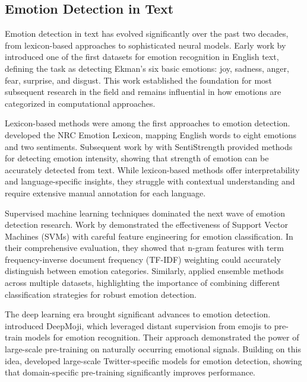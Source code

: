 \documentclass[a4paper,12pt]{extarticle}
\begin{document}
\subsection{Emotion Detection in Text}

Emotion detection in text has evolved significantly over the past two decades, from lexicon-based approaches to sophisticated neural models. Early work by \cite{strapparava2007semeval} introduced one of the first datasets for emotion recognition in English text, defining the task as detecting Ekman's six basic emotions: joy, sadness, anger, fear, surprise, and disgust. This work established the foundation for most subsequent research in the field and remains influential in how emotions are categorized in computational approaches.

Lexicon-based methods were among the first approaches to emotion detection. \cite{mohammad2013crowdsourcing} developed the NRC Emotion Lexicon, mapping English words to eight emotions and two sentiments. Subsequent work by \cite{thelwall2010sentiment} with SentiStrength provided methods for detecting emotion intensity, showing that strength of emotion can be accurately detected from text. While lexicon-based methods offer interpretability and language-specific insights, they struggle with contextual understanding and require extensive manual annotation for each language.

Supervised machine learning techniques dominated the next wave of emotion detection research. Work by \cite{balahur2013sentiment} demonstrated the effectiveness of Support Vector Machines (SVMs) with careful feature engineering for emotion classification. In their comprehensive evaluation, they showed that n-gram features with term frequency-inverse document frequency (TF-IDF) weighting could accurately distinguish between emotion categories. Similarly, \cite{colneric2018emotion} applied ensemble methods across multiple datasets, highlighting the importance of combining different classification strategies for robust emotion detection.

The deep learning era brought significant advances to emotion detection. \cite{felbo2017using} introduced DeepMoji, which leveraged distant supervision from emojis to pre-train models for emotion recognition. Their approach demonstrated the power of large-scale pre-training on naturally occurring emotional signals. Building on this idea, \cite{abdul2017emonet} developed large-scale Twitter-specific models for emotion detection, showing that domain-specific pre-training significantly improves performance.
\end{document}
